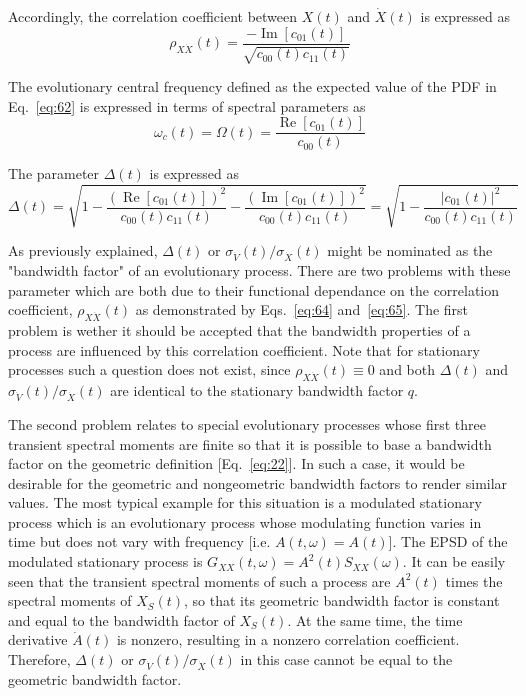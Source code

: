 \documentclass[12pt]{article}
\begin{document}
Accordingly, the correlation coefficient between $X(t)$ and $\dot{X}(t)$ is expressed as
\begin{equation}
\rho_{X \dot{X}}(t)=\frac{-\operatorname{Im}\left[c_{01}(t)\right]}{\sqrt{c_{00}(t) c_{11}(t)}}
\label{eq:67}
\end{equation}

The evolutionary central frequency defined as the expected value of the PDF in Eq.~\eqref{eq:62} is expressed in terms of spectral parameters as
\begin{equation}
\omega_{c}(t)=\Omega(t)=\frac{\operatorname{Re}\left[c_{01}(t)\right]}{c_{00}(t)}
\label{eq:68}
\end{equation}

The parameter $\Delta(t)$ is expressed as
\begin{equation}
\Delta(t)=\sqrt{1-\frac{\left(\operatorname{Re}\left[c_{01}(t)\right]\right)^{2}}{c_{00}(t) c_{11}(t)}-\frac{\left(\operatorname{Im}\left[c_{01}(t)\right]\right)^{2}}{c_{00}(t) c_{11}(t)}}=\sqrt{1-\frac{\left|c_{01}(t)\right|^{2}}{c_{00}(t) c_{11}(t)}}
\label{eq:69}
\end{equation}

As previously explained, $\Delta(t)$ or $\sigma_{\dot{V}}(t) / \sigma_{\dot{X}}(t)$ might be nominated as the "bandwidth factor" of an evolutionary process. There are two problems with these parameter which are both due to their functional dependance on the correlation coefficient, $\rho_{X \dot{X}}(t)$ as demonstrated by Eqs.~\eqref{eq:64} and~\eqref{eq:65}. The first problem is wether it should be accepted that the bandwidth properties of a process are influenced by this correlation coefficient. Note that for stationary processes such a question does not exist, since $\rho_{X \dot{X}}(t) \equiv 0$ and both $\Delta(t)$ and $\sigma_{\dot{V}}(t) / \sigma_{\dot{X}}(t)$ are identical to the stationary bandwidth factor $q$.

The second problem relates to special evolutionary processes whose first three transient spectral moments are finite so that it is possible to base a bandwidth factor on the geometric definition [Eq.~\eqref{eq:22}]. In such a case, it would be desirable for the geometric and nongeometric bandwidth factors to render similar values. The most typical example for this situation is a modulated stationary process which is an evolutionary process whose modulating function varies in time but does not vary with frequency [i.e. $A(t, \omega)=A(t)$]. The EPSD of the modulated stationary process is
$G_{X X}(t, \omega)=A^{2}(t) S_{X X}(\omega)$. It can be easily seen that the transient spectral moments of such a process are $A^{2}(t)$ times the spectral moments of $X_{S}(t)$, so that its geometric bandwidth factor is constant and equal to the bandwidth factor of $X_{S}(t)$. At the same time, the time derivative $\dot{A}(t)$ is nonzero, resulting in a nonzero correlation coefficient. Therefore, $\Delta(t)$ or $\sigma_{\dot{V}}(t) / \sigma_{\dot{X}}(t)$ in this case cannot be equal to the geometric bandwidth factor.
\end{document}
